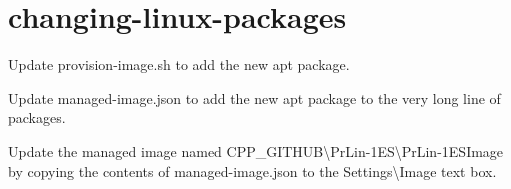 \chapter{changing-\/linux-\/packages}
\hypertarget{md_external_2reflect-cpp_2vcpkg_2scripts_2azure-pipelines_2linux_2changing-linux-packages}{}\label{md_external_2reflect-cpp_2vcpkg_2scripts_2azure-pipelines_2linux_2changing-linux-packages}

\begin{DoxyItemize}
\item[\DoxyUnchecked] Update {\ttfamily provision-\/image.\+sh} to add the new apt package.
\end{DoxyItemize}
\begin{DoxyItemize}
\item[\DoxyUnchecked] Update {\ttfamily managed-\/image.\+json} to add the new apt package to the very long line of packages.
\end{DoxyItemize}
\begin{DoxyItemize}
\item[\DoxyUnchecked] Update the managed image named CPP\+\_\+\+GITHUB\textbackslash{}\+Pr\+Lin-\/1ES\textbackslash{}\+Pr\+Lin-\/1ESImage by copying the contents of {\ttfamily managed-\/image.\+json} to the Settings\textbackslash{}\+Image text box. 
\end{DoxyItemize}